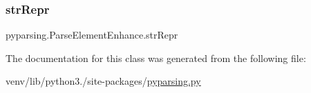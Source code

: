 \mbox{\label{classpyparsing_1_1ParseElementEnhance_a97d5897de62788da4a95a4528d0da16c}} 
\subsubsection{\texorpdfstring{str\+Repr}{strRepr}}
{\footnotesize\ttfamily pyparsing.\+Parse\+Element\+Enhance.\+str\+Repr}



The documentation for this class was generated from the following file\+:\begin{DoxyCompactItemize}
\item 
venv/lib/python3./site-\/packages/\hyperlink{pyparsing_8py}{pyparsing.\+py}\end{DoxyCompactItemize}
